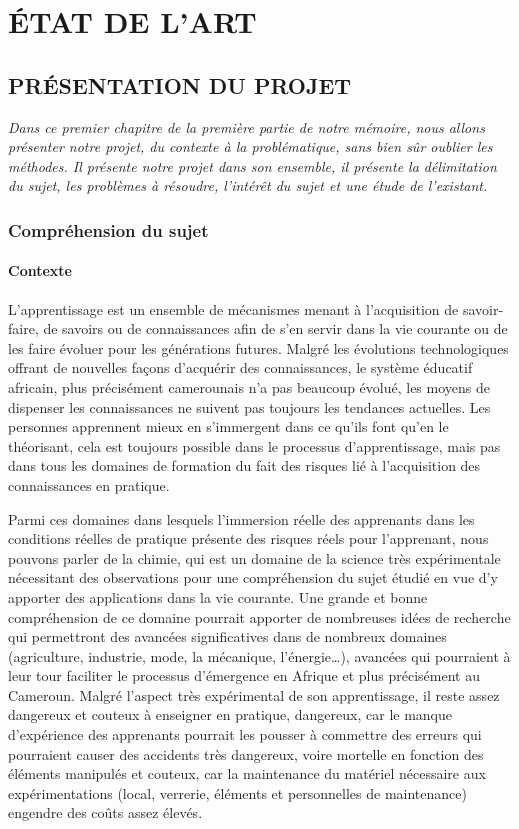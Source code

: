 \part{ÉTAT DE L’ART}
\chapter{PRÉSENTATION DU PROJET}

\textit{Dans ce premier chapitre de la première partie de notre mémoire, nous allons présenter
	notre projet, du contexte à la problématique, sans bien sûr oublier les méthodes. Il présente
	notre projet dans son ensemble, il présente la délimitation du sujet, les problèmes à résoudre,
	l’intérêt du sujet et une étude de l’existant.}

\clearpage

\section{Compréhension du sujet}

\subsection{Contexte}

L’apprentissage est un ensemble de mécanismes menant à l'acquisition de savoir-faire, de savoirs ou de connaissances afin de s’en servir dans la vie courante ou de les faire évoluer pour les générations futures.
Malgré les évolutions technologiques offrant de nouvelles façons d’acquérir des connaissances, le système éducatif africain, plus précisément camerounais n’a pas beaucoup évolué, les moyens de dispenser les connaissances ne suivent pas toujours les tendances actuelles.
Les personnes apprennent mieux en s’immergent dans ce qu’ils font qu’en le théorisant, cela est toujours possible dans le processus d’apprentissage, mais pas dans tous les domaines de formation du fait des risques lié à l’acquisition des connaissances en pratique.

Parmi ces domaines dans lesquels l’immersion réelle des apprenants dans les conditions réelles de pratique présente des risques réels pour l’apprenant, nous pouvons parler de la chimie, qui est un domaine de la science très expérimentale nécessitant des observations pour une compréhension du sujet étudié en vue d’y apporter des applications dans la vie courante.
Une grande et bonne compréhension de ce domaine pourrait apporter de nombreuses idées de recherche qui permettront des avancées significatives dans de nombreux domaines (agriculture, industrie, mode, la mécanique, l'énergie…), avancées qui pourraient à leur tour faciliter le processus d'émergence en Afrique et plus précisément au Cameroun.
Malgré l'aspect très expérimental de son apprentissage, il reste assez dangereux et couteux à enseigner en pratique, dangereux, car le manque d’expérience des apprenants pourrait les pousser à commettre des erreurs qui pourraient causer des accidents très dangereux, voire mortelle en fonction des éléments manipulés et couteux, car la maintenance du matériel nécessaire aux expérimentations (local, verrerie, éléments et personnelles de maintenance) engendre des coûts assez élevés.

